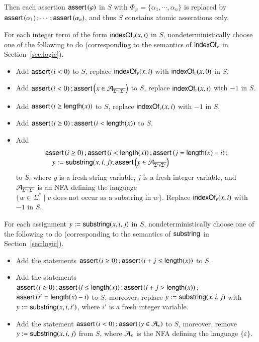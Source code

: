 Then each assertion $\textsf{assert}\left(\varphi\right)$ in $S$ with $\Phi_\varphi = \{\alpha_1,\cdots,\alpha_n\}$ is replaced by $\textsf{assert}\left(\alpha_1\right); \cdots; \textsf{assert}\left(\alpha_n\right)$, and thus $S$ constains atomic asserations only. 

\medskip 
{}%

\smallskip

For each integer term of the form $\mathsf{indexOf}_v(x,i)$ in $S$, nondeterministically choose one of the following to do (corresponding to the semantics of $\mathsf{indexOf}_v$ in Section~\ref{sec:logic}).
\begin{itemize}
\item Add $\textsf{assert}\left(i < 0\right)$ to $S$, replace $\mathsf{indexOf}_v(x,i)$ with $\mathsf{indexOf}_v(x,0)$ in $S$. 
%
\item Add $\textsf{assert}\left(i < 0\right);\textsf{assert}\left(x \in \mathcal{A}_{\overline{\Sigma^*v\Sigma^*}}\right)$ to $S$, replace $\mathsf{indexOf}_v(x,i)$ with $-1$ in $S$.
%
\item Add $\textsf{assert}\left(i \ge \mathsf{length}(x)\right)$ to $S$, replace $\mathsf{indexOf}_v(x,i)$ with $-1$ in $S$.
%
\item Add $\textsf{assert}\left(i \ge 0\right); \textsf{assert}\left(i < \mathsf{length}(x)\right)$ to $S$.
%
\item Add 
%
$$
\begin{array}{l}
\textsf{assert}\left(i \ge 0\right); \textsf{assert}\left(i < \mathsf{length}(x)\right); \textsf{assert}\left(j=\mathsf{length}(x)-i\right); \\
\ \ \ \ y:=\mathsf{substring}(x, i, j); \textsf{assert}\left(y \in \mathcal{A}_{\overline{\Sigma^*v\Sigma^*}}\right)
\end{array}
$$ 
to $S$, where $y$ is a fresh string variable, $j$ is a fresh integer variable, and $\mathcal{A}_{\overline{\Sigma^*v\Sigma^*}}$ is an NFA defining the language $\{w \in \Sigma^*\mid v \mbox{ does not occur as a substring in } w\}$. Replace $\mathsf{indexOf}_v(x, i)$ with $-1$ in $S$.
\end{itemize}

%
For each assignment $y:=\mathsf{substring}(x, i, j)$ in $S$, nondeterministically choose one of the following to do (corresponding to the semantics of $\mathsf{substring}$ in Section~\ref{sec:logic}).
\begin{itemize}
\item Add the statements $\textsf{assert}\left(i \ge 0\right); \textsf{assert}\left(i + j \le \mathsf{length}(x)\right)$ to $S$. 
%
\item Add the statements 
$\textsf{assert}\left(i \ge 0\right); \textsf{assert}\left(i \le \mathsf{length}(x)\right);\textsf{assert}\left(i+j  > \mathsf{length}(x)\right)$; $\textsf{assert}\left(i'  = \mathsf{length}(x)-i\right)$
to $S$, moreover, replace $y:=\mathsf{substring}(x, i, j)$ with $y:=\mathsf{substring}(x, i, i')$, where $i'$ is a fresh integer variable.
%
\item Add the statement $\textsf{assert}\left(i < 0\right); \textsf{assert}\left(y \in \mathcal{A}_\varepsilon\right)$ to $S$, moreover, remove $y:=\mathsf{substring}(x, i, j)$ from $S$, where $\mathcal{A}_\varepsilon$ is the NFA defining the language $\{\varepsilon\}$.
\end{itemize}

